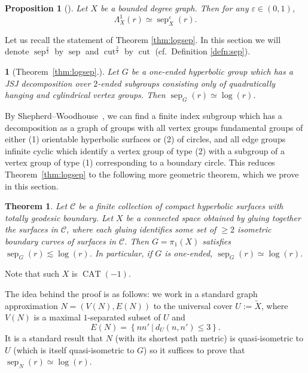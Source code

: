 \documentclass[11pt]{amsart}
\numberwithin{equation}{section}
\newtheorem{theorem}[equation]{Theorem}
\newtheorem{proposition}[equation]{Proposition}
\theoremstyle{citing}
\newtheorem*{varthm}{}%
\DeclareMathOperator{\cut}{cut}
\DeclareMathOperator{\sep}{sep}
\DeclareMathOperator{\CAT}{CAT}
\newcommand{\setcon}[2]{\left\{#1\ \left|\ #2\right.\right\}}
\newcommand{\cC}{\mathcal{C}}
\numberwithin{equation}{section}
\begin{document}
\begin{proposition}[\cite{BenSchTim-12-separation-graphs,HumeMackTess-Pprof}]
    Let $X$ be a bounded degree graph. Then for any $\varepsilon \in (0, 1)$,
    \[
        \Lambda^1_X(r) \simeq \sep^\varepsilon_X(r).
    \]
\end{proposition}

Let us recall the statement of Theorem \ref{thm:logsep}.  In this section we will denote $\sep^{\frac23}$ by $\sep$ and $\cut^{\frac23}$ by $\cut$ (cf.\ Definition \ref{defn:sep}).

\begin{varthm}[Theorem~\ref{thm:logsep}.]
	Let $G$ be a one-ended hyperbolic group which has a JSJ decomposition over $2$-ended subgroups consisting only of quadratically hanging and cylindrical vertex groups.
	Then $\sep_{G}(r) \simeq \log(r)$.
\end{varthm}

By Shepherd--Woodhouse~\cite[Theorem 1.2; see Remark 3.6, Theorem 3.9, Lemma 3.12]{ShepWood-22-QI-rigid-vfree-amalgams}, we can find a finite index subgroup which has a decomposition as a graph of groups with all vertex groups fundamental groups of either (1) orientable hyperbolic surfaces or (2) of circles, and all edge groups infinite cyclic which identify a vertex group of type (2) with a subgroup of a vertex group of type (1) corresponding to a boundary circle.  
This reduces Theorem~\ref{thm:logsep} to the following more geometric theorem, which we prove in this section.

\begin{theorem}\label{thm:logsep-geom}
Let $\cC$ be a finite collection of compact hyperbolic surfaces with totally geodesic boundary.
Let $X$ be a connected space obtained by gluing together the surfaces in $\cC$, where each gluing identifies some set of $\geq 2$ isometric boundary curves of surfaces in $\cC$.
	Then $G= \pi_1(X)$ satisfies $\sep_{G}(r)\lesssim \log(r)$.
	In particular, if $G$ is one-ended, $\sep_G(r) \simeq \log(r)$.
\end{theorem}
Note that such $X$ is $\CAT(-1)$.


The idea behind the proof is as follows: we work in a standard graph approximation $N=(V(N),E(N))$ to the universal cover $U:=\widetilde{X}$, where $V(N)$ is a maximal $1$-separated subset of $U$ and
\[
    E(N) = \setcon{nn'}{d_U(n,n')\leq 3}.
\]
It is a standard result that $N$ (with its shortest path metric) is quasi-isometric to $U$ (which is itself quasi-isometric to $G$) so it suffices to prove that $\sep_N(r) \simeq \log(r)$.
\end{document}
